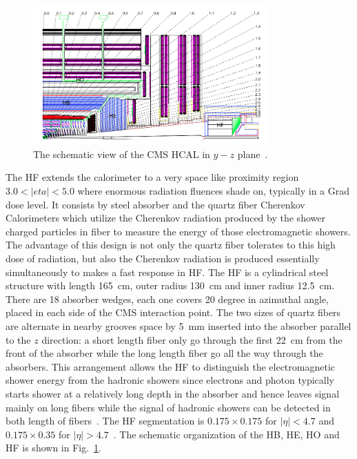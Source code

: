 \begin{figure}[ht]
  \begin{center}
    \includegraphics[width=0.8\textwidth]{figures/detector/CMS_HCAL.png}
  \end{center}
  \caption{The schematic view of the CMS HCAL in $y-z$ plane~\cite{Bayatian:2006nff}.}
  \label{fig:cms_hcal}
\end{figure}

The HF extends the calorimeter to a very space like proximity region $3.0<|eta|<5.0$ where enormous radiation fluences shade on, typically in a Grad dose level. It consists by steel absorber and the quartz fiber Cherenkov Calorimeters which utilize the Cherenkov radiation produced by the shower charged particles in fiber to measure the energy of those electromagnetic showers. The advantage of this design is not only the quartz fiber tolerates to this high dose of radiation, but also the Cherenkov radiation is produced essentially simultaneously to makes a fast response in HF. The HF is a cylindrical steel structure with length 165~cm, outer radius 130~cm and inner radius 12.5~cm. There are 18 absorber wedges, each one covers 20 degree in azimuthal angle, placed in each side of the CMS interaction point. The two sizes of quartz fibers are alternate in nearby grooves space by 5~mm inserted into the absorber parallel to the $z$ direction: a short length fiber only go through the first 22~cm from the front of the absorber while the long length fiber go all the way through the absorbers. This arrangement allows the HF to distinguish the electromagnetic shower energy from the hadronic showers since electrons and photon typically starts shower at a relatively long depth in the absorber and hence leaves signal mainly on long fibers while the signal of hadronic showers can be detected in both length of fibers~\cite{Penzo:2009zz}. The HF segmentation is $0.175\times0.175$ for $|\eta|<4.7$ and $0.175\times0.35$ for $|\eta|>4.7$~\cite{Chatrchyan:2009ag}. The schematic organization of the HB, HE, HO and HF is shown in Fig.~\ref{fig:cms_hcal}.
	


